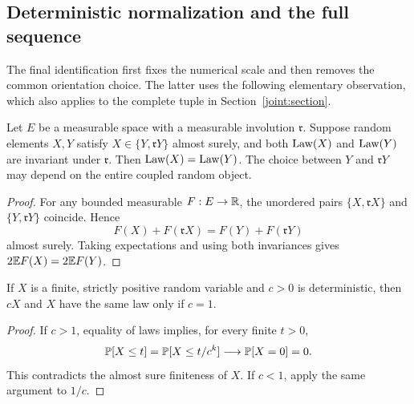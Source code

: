 \subsection{Deterministic normalization and the full sequence}

The final identification first fixes the numerical scale and then
removes the common orientation choice.  The latter uses the following
elementary observation, which also applies to the complete tuple in
Section~\ref{joint:section}.

\begin{lemma}\label{joint:reflection}
Let $E$ be a measurable space with a measurable involution
$\mathfrak r$.  Suppose random elements $X,Y$ satisfy
$X\in\{Y,\mathfrak rY\}$ almost surely, and both $\operatorname{Law}(X)$ and
$\operatorname{Law}(Y)$ are invariant under $\mathfrak r$.  Then
$\operatorname{Law}(X)=\operatorname{Law}(Y)$.  The choice between $Y$ and $\mathfrak rY$ may
depend on the entire coupled random object.
\end{lemma}

\begin{proof}
For any bounded measurable $F:E\to\mathbb R$, the unordered pairs
$\{X,\mathfrak rX\}$ and $\{Y,\mathfrak rY\}$ coincide.  Hence
\[
 F(X)+F(\mathfrak rX)=F(Y)+F(\mathfrak rY)
\]
almost surely.  Taking expectations and using both invariances gives
$2\mathbb E F(X)=2\mathbb E F(Y)$.
\end{proof}

\begin{lemma}
\label{comp:scalar}
If $X$ is a finite, strictly positive random variable and $c>0$
is deterministic, then $cX$ and $X$ have the same law only if
$c=1$.
\end{lemma}

\begin{proof}
If $c>1$, equality of laws implies, for every finite $t>0$,
\[
 \mathbb P[X\le t]=\mathbb P[X\le t/c^k]\longrightarrow\mathbb P[X=0]=0.
\]
This contradicts the almost sure finiteness of $X$.  If $c<1$,
apply the same argument to $1/c$.
\end{proof}

